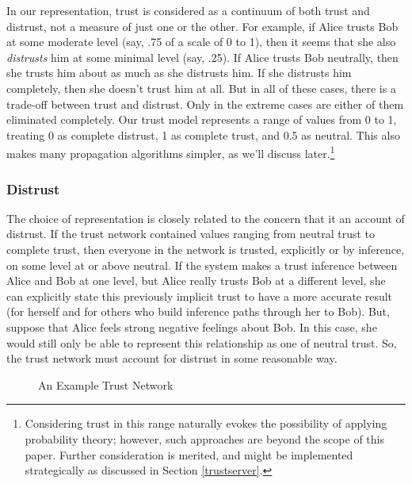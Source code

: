 \documentclass[letterpaper]{www2006-submission}
\begin{document}
In our representation, trust is considered as a continuum of both trust and distrust, not a measure of just one or the other.  For example, if Alice trusts Bob at some moderate level (say, .75 of a scale of 0 to 1), then it seems that she also \textit{distrusts} him at some minimal level (say, .25).  If Alice trusts Bob neutrally, then she trusts him about as much as she distrusts him.  If she distrusts him completely, then she doesn't trust him at all.  But in all of these cases, there is a trade-off between trust and distrust.  Only in the extreme cases are either of them eliminated completely.  Our trust model represents a range of values from 0 to 1, treating 0 as complete distrust, 1 as complete trust, and 0.5 as neutral.  This also makes many propagation algorithms simpler, as we'll discuss later.\footnote{Considering trust in this range naturally evokes the possibility of applying probability theory; however, such approaches are beyond the scope of this paper.  Further consideration is merited, and might be implemented strategically as discussed in Section \ref{trustserver}.}

\subsubsection{Distrust}
The choice of representation is closely related to the concern that it an account of distrust.  If the trust network contained values ranging from neutral trust to complete trust, then everyone in the network is trusted, explicitly or by inference, on some level at or above neutral.  If the system makes a trust inference between Alice and Bob at one level, but Alice really trusts Bob at a different level, she can explicitly state this previously implicit trust to have a more accurate result (for herself and for others who build inference paths through her to Bob).  But, suppose that Alice feels strong negative feelings about Bob.  In this case, she would still only be able to represent this relationship as one of neutral trust.  So, the trust network must account for distrust in some reasonable way.

\begin{figure}[thp]
\centering
{}
\caption{An Example Trust Network}
\label{fig:trust}
\end{figure}
\end{document}
